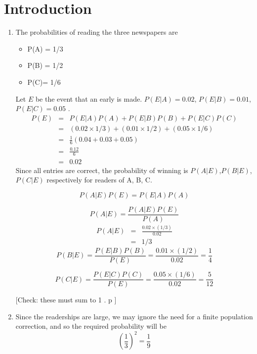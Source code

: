 \documentclass[a4paper,12pt]{article}
\begin{document}
\section{Introduction}
\begin{enumerate}

\item The probabilities of reading the three newspapers are
\begin{itemize}
\item P(A) = 1/3
\item P(B) = 1/2 
\item P(C)= 1/6 
\end{itemize}

Let $E$ be the event that an early is made.
$P(E|A)=0.02$, $P(E|B)=0.01$, $P(E|C)=0.05$ .
\begin{eqnarray*}
P(E) &=& P(E|A)P(A) + P(E|B)P(B) + P(E|C)P(C)\\
&=& (0.02 \times  1/3 ) + (0.01 \times  1
/2 ) + (0.05 \times  1/6 )\\
&=& \frac{1}{6}(0.04 + 0.03 + 0.05)
\\&=& \frac{0.12}{6}
 \\ &=& 0.02
\end{eqnarray*}
Since all entries are correct, the probability of winning is $P(A|E)$,$P(B|E)$,$P(C|E)$ respectively for
readers of A, B, C.

\[P(A|E)P(E) =   P(E|A)P(A) \] 

\[P(A|E) = \frac{P(A|E)P(E)}{P(A)}\]
\begin{eqnarray*}
P(A|E) &=& \frac{0.02\times (1/3)}{0.02} 
\\&=&  1/3 
\end{eqnarray*}
\[P(B|E)=\frac{P(E|B)P(B)}{P(E)}=\frac{0.01\times( 1/2)}{0.02} = \frac{1}{4}\]

\[P(C|E)=\frac{P(E|C)P(C)}{P(E)}=\frac{0.05\times( 1/6)}{0.02} = \frac{5}{12}\]

[Check: these must sum to 1 .
p
]

\item Since the readerships are large, we may ignore the need for a finite population correction, and
so the required probability will be \[ \left( \frac{1}{3}\right)^2 = \frac{1}{9}\]


\end{enumerate}
\end{document}
